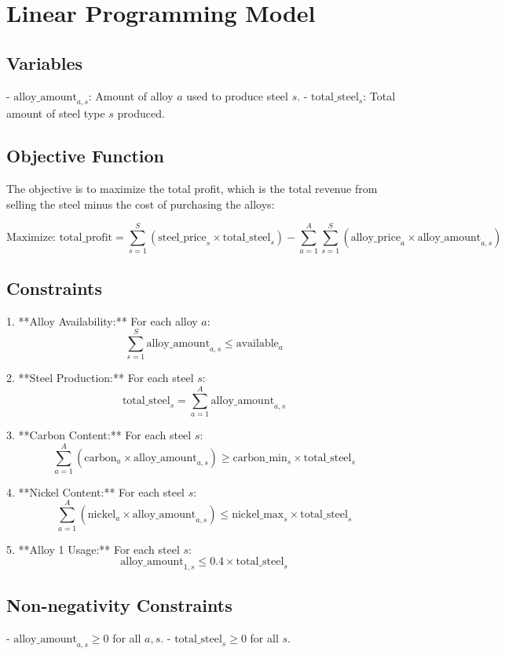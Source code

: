 \documentclass{article}
\begin{document}
\section*{Linear Programming Model}

\subsection*{Variables}
- \( \text{alloy\_amount}_{a,s} \): Amount of alloy \( a \) used to produce steel \( s \).
- \( \text{total\_steel}_s \): Total amount of steel type \( s \) produced.

\subsection*{Objective Function}
The objective is to maximize the total profit, which is the total revenue from selling the steel minus the cost of purchasing the alloys:

\[
\text{Maximize: } \text{total\_profit} = \sum_{s=1}^{S} \left( \text{steel\_price}_s \times \text{total\_steel}_s \right) - \sum_{a=1}^{A} \sum_{s=1}^{S} \left( \text{alloy\_price}_a \times \text{alloy\_amount}_{a,s} \right)
\]

\subsection*{Constraints}

1. **Alloy Availability:**
   For each alloy \( a \):
   \[
   \sum_{s=1}^{S} \text{alloy\_amount}_{a,s} \leq \text{available}_a
   \]

2. **Steel Production:**
   For each steel \( s \):
   \[
   \text{total\_steel}_s = \sum_{a=1}^{A} \text{alloy\_amount}_{a,s}
   \]

3. **Carbon Content:**
   For each steel \( s \):
   \[
   \sum_{a=1}^{A} (\text{carbon}_a \times \text{alloy\_amount}_{a,s}) \geq \text{carbon\_min}_s \times \text{total\_steel}_s
   \]

4. **Nickel Content:**
   For each steel \( s \):
   \[
   \sum_{a=1}^{A} (\text{nickel}_a \times \text{alloy\_amount}_{a,s}) \leq \text{nickel\_max}_s \times \text{total\_steel}_s
   \]

5. **Alloy 1 Usage:**
   For each steel \( s \):
   \[
   \text{alloy\_amount}_{1,s} \leq 0.4 \times \text{total\_steel}_s
   \]

\subsection*{Non-negativity Constraints}
- \( \text{alloy\_amount}_{a,s} \geq 0 \) for all \( a, s \).
- \( \text{total\_steel}_s \geq 0 \) for all \( s \).
\end{document}
